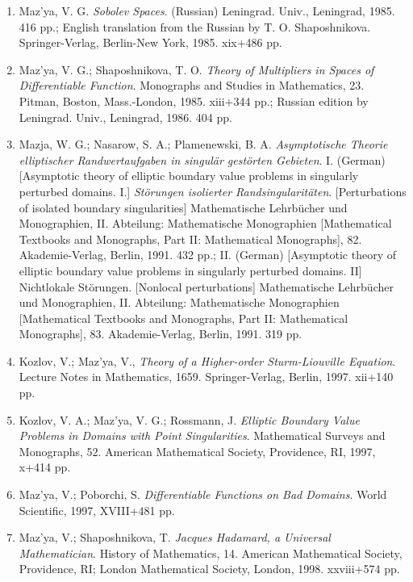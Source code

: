 \documentclass{article}
\begin{document}
\begin{enumerate}
\item Maz'ya, V. G. {\it Sobolev Spaces}. (Russian) Leningrad. Univ.,
Leningrad, 1985. 416 pp.; English translation from the Russian by T.
O.
Shaposhnikova. Springer-Verlag, Berlin-New York, 1985.
xix+486 pp.

\item Maz'ya, V. G.; Shaposhnikova, T. O. {\it Theory of Multipliers
in
Spaces of Differentiable Function}.
Monographs and Studies in Mathematics, 23. Pitman, Boston,
Mass.-London,
1985. xiii+344 pp.;
Russian edition by Leningrad. Univ., Leningrad, 1986. 404 pp.

\item Mazja, W. G.; Nasarow, S. A.; Plamenewski, B. A. {\it
Asymptotische
Theorie elliptischer Randwertaufgaben
in singul{\"a}r gest\"orten Gebieten}. I. (German) [Asymptotic theory
of
elliptic boundary value problems in singularly perturbed
domains. I.] {\it St\"orungen isolierter Randsingularit{\"a}ten}.
[Perturbations of isolated boundary singularities] Mathematische
Lehrb\"ucher und Monographien, II. Abteilung: Mathematische
Monographien
[Mathematical Textbooks and Monographs, Part II:
Mathematical Monographs], 82. Akademie-Verlag, Berlin, 1991. 432 pp.;
  II. (German) [Asymptotic theory of elliptic boundary value problems
in
singularly perturbed domains. II]
Nichtlokale St\"orungen. [Nonlocal perturbations] Mathematische
Lehrb\"ucher und Monographien, II. Abteilung: Mathematische
Monographien [Mathematical Textbooks and Monographs, Part II:
Mathematical
Monographs], 83. Akademie-Verlag, Berlin, 1991. 319 pp.

\item Kozlov, V.; Maz'ya, V., {\it Theory of a Higher-order
Sturm-Liouville
Equation}. Lecture Notes
in Mathematics, 1659. Springer-Verlag, Berlin, 1997. xii+140 pp.

\item Kozlov, V. A.; Maz'ya, V. G.; Rossmann, J. {\it Elliptic
Boundary Value Problems in Domains with Point Singularities}.
Mathematical
Surveys and Monographs, 52. American Mathematical
Society, Providence, RI, 1997, x+414 pp.

\item Maz'ya, V.; Poborchi, S. {\it Differentiable Functions on Bad
Domains}. World Scientific, 1997, XVIII+481 pp.

\item Maz'ya, V.; Shaposhnikova, T. {\it Jacques Hadamard, a Universal
Mathematician}. History of Mathematics, 14. American Mathematical
Society,
Providence, RI; London Mathematical Society, London, 1998. xxviii+574
pp.


\end{enumerate}
\end{document}
